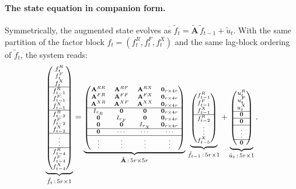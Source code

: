 \documentclass[11pt, a4paper, oneside]{article}
\newcommand{\mA}{\mathbf{A}}
\begin{document}
\paragraph{The state equation in companion form.}
Symmetrically, the augmented state evolves as $\tilde{f}_t = \tilde{\mA}\,\tilde{f}_{t-1} + \tilde{u}_t$.
With the same partition of the factor block $f_t = (f^R_t, f^F_t, f^X_t)$
and the same lag-block ordering of $\tilde{f}_t$, the system reads:
\[
\scriptsize
\underbrace{\begin{pmatrix}
f^R_t \\
f^F_t \\
f^X_t \\
\hline
f^R_{t-1} \\
f^F_{t-1} \\
f^X_{t-1} \\
\hline
f^R_{t-2} \\
f^F_{t-2} \\
f^X_{t-2} \\
\hline
\vdots \\
\hline
f^R_{t-4} \\
f^F_{t-4} \\
f^X_{t-4}
\end{pmatrix}}_{\tilde{f}_t\,:\,5r \times 1}
=
\underbrace{\begin{pmatrix}
\mA^{RR} & \mA^{RF} & \mA^{RX} & \mathbf{0}_{r \times 4r} \\
\mA^{FR} & \mA^{FF} & \mA^{FX} & \mathbf{0}_{r \times 4r} \\
\mA^{XR} & \mA^{XF} & \mA^{XX} & \mathbf{0}_{r \times 4r} \\
\hline
I_{r_R} & \mathbf{0} & \mathbf{0} & \mathbf{0}_{r \times 4r} \\
\mathbf{0} & I_{r_F} & \mathbf{0} & \mathbf{0}_{r \times 4r} \\
\mathbf{0} & \mathbf{0} & I_{r_X} & \mathbf{0}_{r \times 4r} \\
\hline
\mathbf{0} & \cdots & \cdots & \cdots \\
\hline
\vdots & \vdots & \vdots & \vdots
\end{pmatrix}}_{\tilde{\mA}\,:\,5r \times 5r}
\,
\underbrace{\begin{pmatrix}
f^R_{t-1} \\
f^F_{t-1} \\
f^X_{t-1} \\
\hline
f^R_{t-2} \\
\vdots \\
f^X_{t-5}
\end{pmatrix}}_{\tilde{f}_{t-1}\,:\,5r \times 1}
+
\underbrace{\begin{pmatrix}
u^R_t \\
u^F_t \\
u^X_t \\
\hline
\mathbf{0} \\
\hline
\mathbf{0} \\
\hline
\vdots \\
\hline
\mathbf{0}
\end{pmatrix}}_{\tilde{u}_t\,:\,5r \times 1}.
\]
\end{document}
